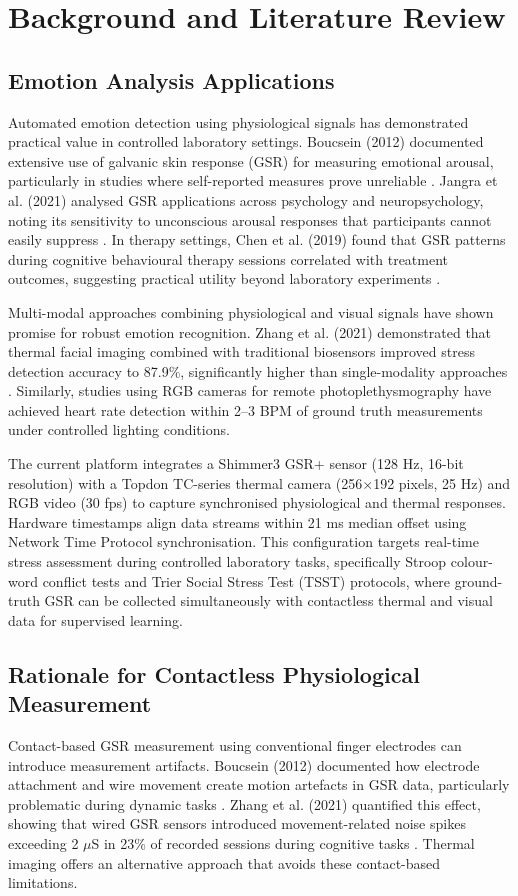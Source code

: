\chapter{Background and Literature Review}

\section{Emotion Analysis Applications}
Automated emotion detection using physiological signals has demonstrated practical value in controlled laboratory settings. Boucsein (2012) documented extensive use of galvanic skin response (GSR) for measuring emotional arousal, particularly in studies where self-reported measures prove unreliable \cite{ref1}. Jangra et al. (2021) analysed GSR applications across psychology and neuropsychology, noting its sensitivity to unconscious arousal responses that participants cannot easily suppress \cite{ref3}. In therapy settings, Chen et al. (2019) found that GSR patterns during cognitive behavioural therapy sessions correlated with treatment outcomes, suggesting practical utility beyond laboratory experiments \cite{ref4}.

Multi-modal approaches combining physiological and visual signals have shown promise for robust emotion recognition. Zhang et al. (2021) demonstrated that thermal facial imaging combined with traditional biosensors improved stress detection accuracy to 87.9\%, significantly higher than single-modality approaches \cite{ref5}. Similarly, studies using RGB cameras for remote photoplethysmography have achieved heart rate detection within 2--3 BPM of ground truth measurements under controlled lighting conditions.

The current platform integrates a Shimmer3 GSR+ sensor (128 Hz, 16-bit resolution) with a Topdon TC-series thermal camera (256$\times$192 pixels, 25 Hz) and RGB video (30 fps) to capture synchronised physiological and thermal responses. Hardware timestamps align data streams within 21 ms median offset using Network Time Protocol synchronisation. This configuration targets real-time stress assessment during controlled laboratory tasks, specifically Stroop colour-word conflict tests and Trier Social Stress Test (TSST) protocols, where ground-truth GSR can be collected simultaneously with contactless thermal and visual data for supervised learning.

\section{Rationale for Contactless Physiological Measurement}
Contact-based GSR measurement using conventional finger electrodes can introduce measurement artifacts. Boucsein (2012) documented how electrode attachment and wire movement create motion artefacts in GSR data, particularly problematic during dynamic tasks \cite{ref1}. Zhang et al. (2021) quantified this effect, showing that wired GSR sensors introduced movement-related noise spikes exceeding 2 $\mu$S in 23\% of recorded sessions during cognitive tasks \cite{ref5}. Thermal imaging offers an alternative approach that avoids these contact-based limitations.

